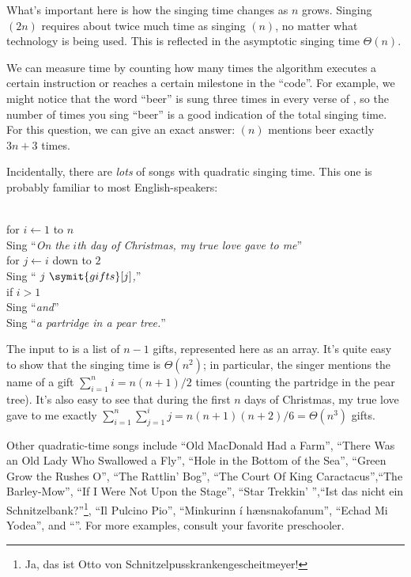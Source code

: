 What’s important here is how the singing time changes as $n$ grows. Singing $(2n)$ requires about twice much time as singing $(n)$, no matter what technology is being used. This is reflected in the asymptotic singing time $\Theta(n)$.

We can measure time by counting how many times the algorithm executes a certain instruction or reaches a certain milestone in the “code”. For example, we might notice that the word “{\sffamily beer}” is sung three times in every verse of , so the number of times you sing “{\sffamily beer}” is a good indication of the total singing time. For this question, we can give an exact answer: $(n)$ mentions {\sffamily beer} exactly $3n + 3$ times.

Incidentally, there are \textit{lots} of songs with quadratic singing time. This one is probably familiar to most English-speakers:

\begin{pseudocode}
\\
for $i \gets 1$ to $n$\\
\Indent Sing “{\sffamily\itshape On the }$i${\sffamily\itshape th day of Christmas, my true love gave to me}”\\
\Indent for $j \gets i$ down to $2$\\
\Indent\Indent Sing “ $j\ \symit{gifts}[j]${\sffamily\itshape ,}”\\
\Indent if $i > 1$\\
\Indent\Indent Sing “{\sffamily\itshape and}”\\
\Indent Sing “{\sffamily\itshape a partridge in a pear tree.}”
\end{pseudocode}

The input to  is a list of $n - 1$ gifts, represented here as an array. It’s quite easy to show that the singing time is $\Theta(n^2)$; in particular, the singer mentions the name of a gift $\sum_{i=1}^{n} i = n(n+1)/2$ times (counting the partridge in the pear tree). It’s also easy to see that during the first $n$ days of Christmas, my true love gave to me exactly $\sum_{i=1}^{n} \sum_{j=1}^{i} j = n(n+1)(n+2)/6 = \Theta(n^3)$ gifts.

Other quadratic-time songs include “Old MacDonald Had a Farm”, “There Was an Old Lady Who Swallowed a Fly”, “Hole in the Bottom of the Sea”, “Green Grow the Rushes O”, “The Rattlin’ Bog”, “The Court Of King Caractacus”,“The Barley-Mow”, “If I Were Not Upon the Stage”, “Star Trekkin’ ”,“Ist das nicht ein Schnitzelbank?”\footnote{Ja, das ist Otto von Schnitzelpusskrankengescheitmeyer!}, “Il Pulcino Pio”, “Minkurinn í hænsnakofanum”, “Echad Mi Yodea”, and “”. For more examples, consult your favorite preschooler.

